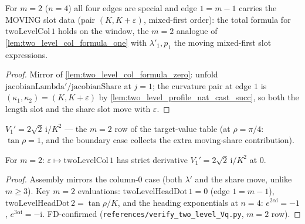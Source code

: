 
\begin{lemma}[column-1 total formula, boundary case $m = 2$]
  \label{lem:two_level_col_formula_one_prime}
  For $m = 2$ ($n = 4$) all four edges are special and edge $1 = m - 1$
  carries the MOVING slot data (pair $(K, K+\varepsilon)$, mixed-first order):
  the total formula for $\mathrm{twoLevelCol}\,1$ holds on the window, the
  $m = 2$ analogue of \cref{lem:two_level_col_formula_one} with
  $\lambda'_1, p_1$ the moving mixed-first slot expressions.
\end{lemma}
\begin{proof}
  Mirror of \cref{lem:two_level_col_formula_zero}: unfold
  $\mathrm{jacobianLambda}'/\mathrm{jacobianShare}$ at $j = 1$; the curvature
  pair at edge $1$ is $(\kappa_1, \kappa_2) = (K, K + \varepsilon)$ by
  \cref{lem:two_level_profile_nat_cast_succ}, so both the length slot and the
  share slot move with $\varepsilon$.
\end{proof}

\begin{definition}[$V_1$ at the boundary case $m = 2$]
  \label{def:two_level_v_one_prime}
  $V_1' = 2\sqrt2\,\mathrm{i}/K^2$ --- the $m = 2$ row of the target-value
  table (at $\rho = \pi/4$: $\tan\rho = 1$, and the boundary case collects the
  extra moving-share contribution).
\end{definition}

\begin{lemma}[column-1 derivative $C_1'(0) = V_1'$, boundary case $m = 2$]
  \label{lem:has_strict_deriv_at_two_level_col_one_prime}
  For $m = 2$: $\varepsilon \mapsto \mathrm{twoLevelCol}\,1$ has strict
  derivative $V_1' = 2\sqrt2\,\mathrm{i}/K^2$ at $0$.
\end{lemma}
\begin{proof}
  Assembly mirrors the column-0 case (both $\lambda'$ and the share move,
  unlike $m \ge 3$). Key $m = 2$ evaluations: $\mathrm{twoLevelHeadDot}\,1 = 0$
  (edge $1 = m-1$), $\mathrm{twoLevelHeadDot}\,2 = \tan\rho/K$, and the
  heading exponentials at $n = 4$: $e^{2\alpha\mathrm{i}} = -1$,
  $e^{3\alpha\mathrm{i}} = -\mathrm{i}$. FD-confirmed
  (\texttt{references/verify\_two\_level\_Vq.py}, $m = 2$ row).
\end{proof}

